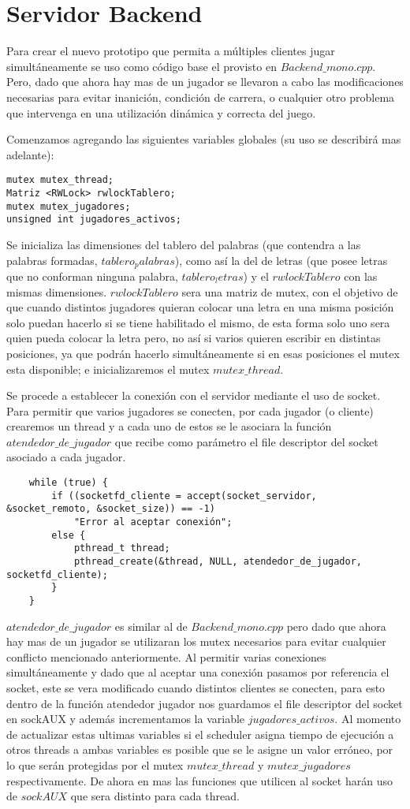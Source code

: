 \section{Servidor Backend}
Para crear el nuevo prototipo que permita a múltiples clientes jugar simultáneamente se uso como  código base el provisto en $Backend\_mono.cpp$. Pero, dado que ahora hay mas de un jugador se llevaron a cabo las modificaciones necesarias para evitar inanición, condición de carrera, o cualquier otro problema que intervenga en una utilización dinámica y correcta del juego.

Comenzamos agregando las siguientes variables globales (su uso se describirá mas adelante):
\begin{verbatim}
mutex mutex_thread;
Matriz <RWLock> rwlockTablero;
mutex mutex_jugadores;
unsigned int jugadores_activos;
\end{verbatim}

Se inicializa las dimensiones del tablero del palabras (que contendra a las palabras formadas, $tablero_palabras$), como así la del de letras (que posee letras que no conforman ninguna palabra, $tablero_letras$) y el $rwlockTablero$ con las mismas dimensiones. $rwlockTablero$ sera una matriz de mutex, con el objetivo de que cuando distintos jugadores quieran  colocar una letra en una misma posición solo puedan hacerlo si se tiene habilitado el mismo, de esta forma solo uno sera quien pueda colocar la letra pero, no así si varios quieren escribir en distintas posiciones, ya que podrán hacerlo simultáneamente si en esas posiciones el mutex esta disponible; e inicializaremos el mutex $mutex\_thread$.

Se procede a establecer la conexión con el servidor mediante el uso de socket. Para permitir que varios jugadores se conecten, por cada jugador (o cliente) crearemos un thread y a cada uno de estos se le asociara la función $atendedor\_de\_jugador$ que recibe como parámetro el file descriptor del socket asociado a cada jugador. 
\begin{verbatim}
    while (true) {
        if ((socketfd_cliente = accept(socket_servidor, &socket_remoto, &socket_size)) == -1)
            "Error al aceptar conexión";
        else {
            pthread_t thread;
            pthread_create(&thread, NULL, atendedor_de_jugador, socketfd_cliente);
        }
    }
\end{verbatim}
$atendedor\_de\_jugador$ es similar al de $Backend\_mono.cpp$ pero dado que ahora hay mas de un jugador se utilizaran los mutex necesarios para evitar cualquier conflicto mencionado anteriormente.
Al permitir varias conexiones simultáneamente y dado que al aceptar una conexión pasamos por referencia el socket, este se vera modificado cuando distintos clientes se conecten, para esto dentro de la función atendedor jugador nos guardamos el file descriptor del socket en sockAUX y además incrementamos la variable $jugadores\_activos$. Al momento de actualizar estas ultimas variables si el scheduler asigna tiempo de ejecución a otros threads a ambas variables es posible que se le asigne un valor erróneo, por lo que serán protegidas por el mutex $mutex\_thread$ y $mutex\_jugadores$ respectivamente. 
De ahora en mas las funciones que utilicen al socket harán uso de $sockAUX$ que sera distinto para cada thread.

